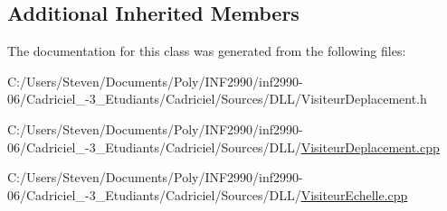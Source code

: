 \subsection*{Additional Inherited Members}


The documentation for this class was generated from the following files\+:\begin{DoxyCompactItemize}
\item 
C\+:/\+Users/\+Steven/\+Documents/\+Poly/\+I\+N\+F2990/inf2990-\/06/\+Cadriciel\+\_-\/3\+\_\+\+Etudiants/\+Cadriciel/\+Sources/\+D\+L\+L/Visiteur\+Deplacement.\+h\item 
C\+:/\+Users/\+Steven/\+Documents/\+Poly/\+I\+N\+F2990/inf2990-\/06/\+Cadriciel\+\_-\/3\+\_\+\+Etudiants/\+Cadriciel/\+Sources/\+D\+L\+L/\hyperlink{_visiteur_deplacement_8cpp}{Visiteur\+Deplacement.\+cpp}\item 
C\+:/\+Users/\+Steven/\+Documents/\+Poly/\+I\+N\+F2990/inf2990-\/06/\+Cadriciel\+\_-\/3\+\_\+\+Etudiants/\+Cadriciel/\+Sources/\+D\+L\+L/\hyperlink{_visiteur_echelle_8cpp}{Visiteur\+Echelle.\+cpp}\end{DoxyCompactItemize}
